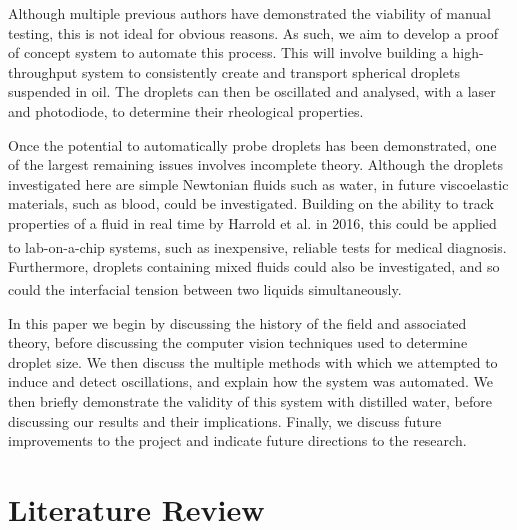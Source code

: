 \documentclass{physics_article_B}
\begin{document}
    Although multiple previous authors have demonstrated the viability of manual testing, this is not ideal for obvious reasons. As such, we aim to develop a proof of concept system to automate this process. This will involve building a high-throughput system to consistently create and transport spherical droplets suspended in oil. The droplets can then be oscillated and analysed, with a laser and photodiode, to determine their rheological properties.
    
    Once the potential to automatically probe droplets has been demonstrated, one of the largest remaining issues involves incomplete theory. Although the droplets investigated here are simple Newtonian fluids such as water, in future viscoelastic materials, such as blood, could be investigated. Building on the ability to track properties of a fluid in real time by Harrold et al. in 2016\cite{harrold}, this could be applied to lab-on-a-chip systems, such as inexpensive, reliable tests\textsuperscript{\cite{yager}} for medical diagnosis. Furthermore, droplets containing mixed fluids could also be investigated, and so could the interfacial tension between two liquids\textsuperscript{\cite{Backholm2017}} simultaneously.
    
    In this paper we begin by discussing the history of the field and associated theory, before discussing the computer vision techniques used to determine droplet size. We then discuss the multiple methods with which we attempted to induce and detect oscillations, and explain how the system was automated. We then briefly demonstrate the validity of this system with distilled water, before discussing our results and their implications. Finally, we discuss future improvements to the project and indicate future directions to the research.

\newpage
\section{Literature Review\label{sect:lit}}
\end{document}
